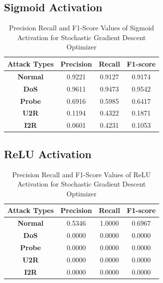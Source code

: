 \documentclass[12pt, a4paper]{report}
\begin{document}
\begin{appendices}
	 \subsection{Sigmoid Activation}
   	\begin{table}[h]
	\centering
	\captionsetup{justification=centering,margin=2cm}
	\begin{tabular}{|c|c|c|c|}
	\hline
	\textbf{Attack Types} & \textbf{Precision} & \textbf{Recall} & \textbf{F1-score} \\ \hline
	\textbf{Normal}       & 0.9221             & 0.9127          & 0.9174            \\ \hline
	\textbf{DoS}          & 0.9611             & 0.9473          & 0.9542            \\ \hline
	\textbf{Probe}        & 0.6916             & 0.5985          & 0.6417            \\ \hline
	\textbf{U2R}          & 0.1194             & 0.4322          & 0.1871            \\ \hline
	\textbf{I2R}          & 0.0601             & 0.4231          & 0.1053            \\ \hline
	\end{tabular}
	\caption{Precision Recall and F1-Score Values of Sigmoid Activation for Stochastic Gradient Descent Optimizer}
	\label{classification sigmoid sgd tflearn}
	\end{table} 

	\subsection{ReLU Activation}
	 \begin{table}[h]
		\centering
		\captionsetup{justification=centering,margin=2cm}
		\begin{tabular}{|c|c|c|c|}
		\hline
		\textbf{Attack Types} & \textbf{Precision} & \textbf{Recall} & \textbf{F1-score} \\ \hline
		\textbf{Normal}       & 0.5346             & 1.0000          & 0.6967            \\ \hline
		\textbf{DoS}          & 0.0000             & 0.0000          & 0.0000            \\ \hline
		\textbf{Probe}        & 0.0000             & 0.0000          & 0.0000            \\ \hline
		\textbf{U2R}          & 0.0000             & 0.0000          & 0.0000            \\ \hline
		\textbf{I2R}          & 0.0000             & 0.0000          & 0.0000            \\ \hline
		\end{tabular}
		\caption{Precision Recall and F1-Score Values of ReLU Activation for Stochastic Gradient Descent Optimizer}
		\label{classification relu sgd tflearn}
		\end{table} 
	

\end{appendices}
\end{document}
